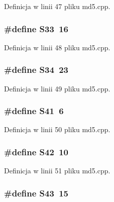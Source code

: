 Definicja w linii 47 pliku md5.cpp.\hypertarget{a00009_1c854214533f6220e859b0063196abb3}{
\subsubsection[{S33}]{\setlength{\rightskip}{0pt plus 5cm}\#define S33~16}}
\label{da/da0/a00009_1c854214533f6220e859b0063196abb3}




Definicja w linii 48 pliku md5.cpp.\hypertarget{a00009_f6472be1d535970afee8e5266a74aa07}{
\subsubsection[{S34}]{\setlength{\rightskip}{0pt plus 5cm}\#define S34~23}}
\label{da/da0/a00009_f6472be1d535970afee8e5266a74aa07}




Definicja w linii 49 pliku md5.cpp.\hypertarget{a00009_b674ba129e588da55d1d494e1cf3c15e}{
\subsubsection[{S41}]{\setlength{\rightskip}{0pt plus 5cm}\#define S41~6}}
\label{da/da0/a00009_b674ba129e588da55d1d494e1cf3c15e}




Definicja w linii 50 pliku md5.cpp.\hypertarget{a00009_268ef1a49114a94b931cc6b313e3cd1b}{
\subsubsection[{S42}]{\setlength{\rightskip}{0pt plus 5cm}\#define S42~10}}
\label{da/da0/a00009_268ef1a49114a94b931cc6b313e3cd1b}




Definicja w linii 51 pliku md5.cpp.\hypertarget{a00009_5aaa7121f39650d472746942ca68f959}{
\subsubsection[{S43}]{\setlength{\rightskip}{0pt plus 5cm}\#define S43~15}}
\label{da/da0/a00009_5aaa7121f39650d472746942ca68f959}




